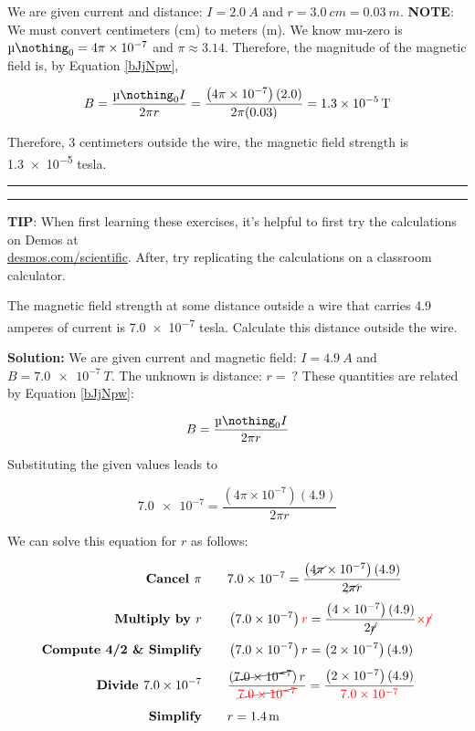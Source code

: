 \documentclass{article}
\begin{document}
We are given current and distance: $I=\SI{2.0}{A}$ and $r = \SI{3.0}{cm} = \SI{0.03}{m}$. \textbf{NOTE}: We must convert centimeters (cm) to meters (m). We know mu-zero is $\mymu_0 = 4\pi \times 10^{-7}$ and $\pi \approx 3.14$. Therefore, the magnitude of the magnetic field is, by Equation \ref{bJjNpw},

\begin{equation*}
    B=\frac{\mymu_0 I}{2\pi r} = \frac{\left(4\pi \times 10^{-7}\right)(2.0)}{2 \pi (0.03)} = \SI{1.3e-5}{T}
\end{equation*}

Therefore, 3 centimeters outside the wire, the magnetic field strength is \num{1.3e-5} tesla.

\bigskip

\hrule\hrule

\bigskip

\textbf{TIP}: When first learning these exercises, it's helpful to first try the calculations on Demos at\\ \href{https://www.desmos.com/scientific}{desmos.com/scientific}. After, try replicating the calculations on a classroom calculator.

\begin{example}
The magnetic field strength at some distance outside a wire that carries 4.9 amperes of current is \num{7.0e-7} tesla. Calculate this distance outside the wire.
\end{example}

\textbf{Solution:} We are given current and magnetic field: $I = \SI{4.9}{A}$ and $B = \SI{7.0e-7}{T}$. The unknown is distance: $r =\ ?$ These quantities are related by Equation \ref{bJjNpw}:

\begin{equation*}
    B = \frac{\mymu_0 I}{2\pi r}
\end{equation*}

Substituting the given values leads to 

\begin{equation*}
    \num{7.0e-7} = \frac{\left(4\pi \times 10^{-7}\right) (4.9)}{2\pi r}
\end{equation*}

We can solve this equation for $r$ as follows:

\begin{align*}
    \textbf{Cancel $\pi$} \qquad &  \num{7.0e-7} = \frac{\left(4\cancel{\pi} \times 10^{-7}\right) (4.9)}{2\cancel{\pi} r}\\[1ex]
    \textbf{Multiply by $r$} \qquad & \left(\num{7.0e-7}\right) \textcolor{red}{r} = \frac{\left(4 \times 10^{-7}\right) (4.9)}{2\cancel{r}} \textcolor{red}{\times} \textcolor{red}{\cancel{r}}\\[1ex]
    \textbf{Compute 4/2 \& Simplify} \qquad & \left(\num{7.0e-7}\right) r = \left(\num{2e-7}\right) (4.9)\\[1ex]
    \textbf{Divide \num{7.0e-7}} \qquad & \frac{\left(\cancel{\num{7.0e-7}}\right) r}{\textcolor{red}{\cancel{\num{7.0e-7}}}} = \frac{\left(\num{2e-7}\right) (4.9)}{\textcolor{red}{\num{7.0e-7}}}\\[1ex]
    \textbf{Simplify} \qquad & r = \SI{1.4}{m}
\end{align*}
\end{document}
